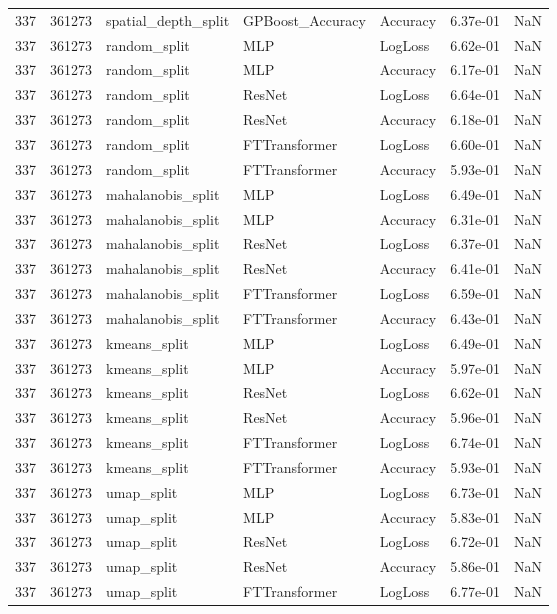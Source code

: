 \begin{tabular}{rrlllrr}
337 & 361273 & spatial\_depth\_split & GPBoost\_Accuracy & Accuracy & 6.37e-01 & NaN \\
337 & 361273 & random\_split & MLP & LogLoss & 6.62e-01 & NaN \\
337 & 361273 & random\_split & MLP & Accuracy & 6.17e-01 & NaN \\
337 & 361273 & random\_split & ResNet & LogLoss & 6.64e-01 & NaN \\
337 & 361273 & random\_split & ResNet & Accuracy & 6.18e-01 & NaN \\
337 & 361273 & random\_split & FTTransformer & LogLoss & 6.60e-01 & NaN \\
337 & 361273 & random\_split & FTTransformer & Accuracy & 5.93e-01 & NaN \\
337 & 361273 & mahalanobis\_split & MLP & LogLoss & 6.49e-01 & NaN \\
337 & 361273 & mahalanobis\_split & MLP & Accuracy & 6.31e-01 & NaN \\
337 & 361273 & mahalanobis\_split & ResNet & LogLoss & 6.37e-01 & NaN \\
337 & 361273 & mahalanobis\_split & ResNet & Accuracy & 6.41e-01 & NaN \\
337 & 361273 & mahalanobis\_split & FTTransformer & LogLoss & 6.59e-01 & NaN \\
337 & 361273 & mahalanobis\_split & FTTransformer & Accuracy & 6.43e-01 & NaN \\
337 & 361273 & kmeans\_split & MLP & LogLoss & 6.49e-01 & NaN \\
337 & 361273 & kmeans\_split & MLP & Accuracy & 5.97e-01 & NaN \\
337 & 361273 & kmeans\_split & ResNet & LogLoss & 6.62e-01 & NaN \\
337 & 361273 & kmeans\_split & ResNet & Accuracy & 5.96e-01 & NaN \\
337 & 361273 & kmeans\_split & FTTransformer & LogLoss & 6.74e-01 & NaN \\
337 & 361273 & kmeans\_split & FTTransformer & Accuracy & 5.93e-01 & NaN \\
337 & 361273 & umap\_split & MLP & LogLoss & 6.73e-01 & NaN \\
337 & 361273 & umap\_split & MLP & Accuracy & 5.83e-01 & NaN \\
337 & 361273 & umap\_split & ResNet & LogLoss & 6.72e-01 & NaN \\
337 & 361273 & umap\_split & ResNet & Accuracy & 5.86e-01 & NaN \\
337 & 361273 & umap\_split & FTTransformer & LogLoss & 6.77e-01 & NaN \\

\end{tabular}
